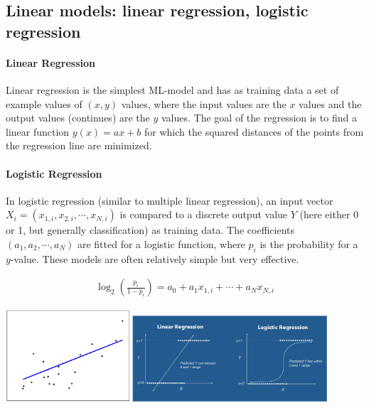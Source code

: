 \subsection{Linear models: linear regression, logistic regression}

\paragraph{Linear Regression}
Linear regression is the simplest ML-model and has as training data a set of example values of $(x,y)$ values, where the input values are the $x$ values and the output values (continues) are the $y$ values. The goal of the regression is to find a linear function $y(x)=ax+b$ for which the squared distances of the points from the regression line are minimized. 

\paragraph{Logistic Regression}
In logistic regression (similar to multiple linear regression), an input vector $X_i=(x_{1,i}, x_{2,i},\cdots,x_{N,i})$ is compared to a discrete output value $Y$ (here either 0 or 1, but generally classification) as training data. The coefficients $(a_1,a_2,\cdots,a_N)$ are fitted for a logistic function, where $p_i$ is the probability for a $y$-value. These models are often relatively simple but very effective.

\begin{align}
    \log_{2}\left(\frac{p_i}{1-p_i}\right)=a_0+a_1x_{1,i}+\cdots+a_Nx_{N,i}
\end{align}

\begin{center}\includegraphics[width=0.35\textwidth]{img/machine/MachineLinearRegression.png}\includegraphics[width=0.55\textwidth]{img/machine/MachineLogisticRegression.png}\end{center}

